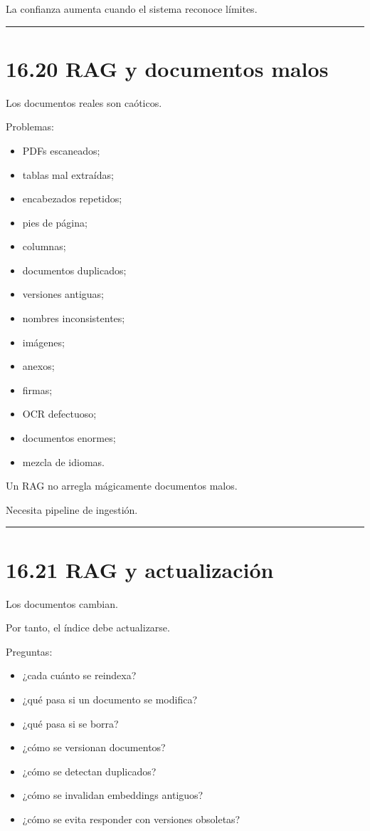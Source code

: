 La confianza aumenta cuando el sistema reconoce límites.

\begin{center}\rule{0.5\linewidth}{0.5pt}\end{center}

\section{16.20 RAG y documentos malos}\label{rag-y-documentos-malos}

Los documentos reales son caóticos.

Problemas:

\begin{itemize}
\tightlist
\item
  PDFs escaneados;
\item
  tablas mal extraídas;
\item
  encabezados repetidos;
\item
  pies de página;
\item
  columnas;
\item
  documentos duplicados;
\item
  versiones antiguas;
\item
  nombres inconsistentes;
\item
  imágenes;
\item
  anexos;
\item
  firmas;
\item
  OCR defectuoso;
\item
  documentos enormes;
\item
  mezcla de idiomas.
\end{itemize}

Un RAG no arregla mágicamente documentos malos.

Necesita pipeline de ingestión.

\begin{center}\rule{0.5\linewidth}{0.5pt}\end{center}

\section{16.21 RAG y actualización}\label{rag-y-actualizaciuxf3n}

Los documentos cambian.

Por tanto, el índice debe actualizarse.

Preguntas:

\begin{itemize}
\tightlist
\item
  ¿cada cuánto se reindexa?
\item
  ¿qué pasa si un documento se modifica?
\item
  ¿qué pasa si se borra?
\item
  ¿cómo se versionan documentos?
\item
  ¿cómo se detectan duplicados?
\item
  ¿cómo se invalidan embeddings antiguos?
\item
  ¿cómo se evita responder con versiones obsoletas?
\end{itemize}

